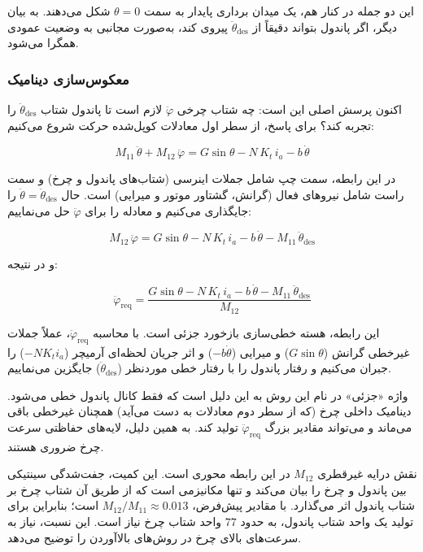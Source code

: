 این دو جمله در کنار هم، یک میدان برداری پایدار به سمت $\theta = 0$ شکل می‌دهند. به بیان دیگر، اگر پاندول بتواند دقیقاً از $\ddot\theta_{\text{des}}$ پیروی کند، به‌صورت مجانبی به وضعیت عمودی همگرا می‌شود.

\subsubsection{معکوس‌سازی دینامیک}

اکنون پرسش اصلی این است: چه شتاب چرخی $\ddot\varphi$ لازم است تا پاندول شتاب $\ddot\theta_{\text{des}}$ را تجربه کند؟ برای پاسخ، از سطر اول معادلات کوپل‌شده حرکت شروع می‌کنیم:

\begin{equation}
    M_{11}\,\ddot\theta + M_{12}\,\ddot\varphi = G\sin\theta - N\,K_t\, i_a - b\,\dot\theta
\end{equation}

در این رابطه، سمت چپ شامل جملات اینرسی (شتاب‌های پاندول و چرخ) و سمت راست شامل نیروهای فعال (گرانش، گشتاور موتور و میرایی) است. حال $\ddot\theta = \ddot\theta_{\text{des}}$ را جایگذاری می‌کنیم و معادله را برای $\ddot\varphi$ حل می‌نماییم:

\begin{equation}
    M_{12}\,\ddot\varphi = G\sin\theta - N\,K_t\, i_a - b\,\dot\theta - M_{11}\,\ddot\theta_{\text{des}}
\end{equation}

و در نتیجه:

\begin{equation}
    \boxed{\ddot\varphi_{\text{req}} = \frac{G\sin\theta - N\,K_t\, i_a - b\,\dot\theta - M_{11}\,\ddot\theta_{\text{des}}}{M_{12}}}
\end{equation}

این رابطه، هسته خطی‌سازی بازخورد جزئی است. با محاسبه $\ddot\varphi_{\text{req}}$، عملاً جملات غیرخطی گرانش ($G\sin\theta$) و میرایی ($-b\dot\theta$) و اثر جریان لحظه‌ای آرمیچر ($-N K_t i_a$) را جبران می‌کنیم و رفتار پاندول را با رفتار خطی موردنظر ($\ddot\theta_{\text{des}}$) جایگزین می‌نماییم.

واژه «جزئی» در نام این روش به این دلیل است که فقط کانال پاندول خطی می‌شود. دینامیک داخلی چرخ (که از سطر دوم معادلات به دست می‌آید) همچنان غیرخطی باقی می‌ماند و می‌تواند مقادیر بزرگ $\ddot\varphi_{\text{req}}$ تولید کند. به همین دلیل، لایه‌های حفاظتی سرعت چرخ ضروری هستند.

نقش درایه غیرقطری $M_{12}$ در این رابطه محوری است. این کمیت، جفت‌شدگی سینتیکی بین پاندول و چرخ را بیان می‌کند و تنها مکانیزمی است که از طریق آن شتاب چرخ بر شتاب پاندول اثر می‌گذارد. با مقادیر پیش‌فرض، $M_{12}/M_{11} \approx 0.013$ است؛ بنابراین برای تولید یک واحد شتاب پاندول، به حدود $77$ واحد شتاب چرخ نیاز است. این نسبت، نیاز به سرعت‌های بالای چرخ در روش‌های بالاآوردن را توضیح می‌دهد.

